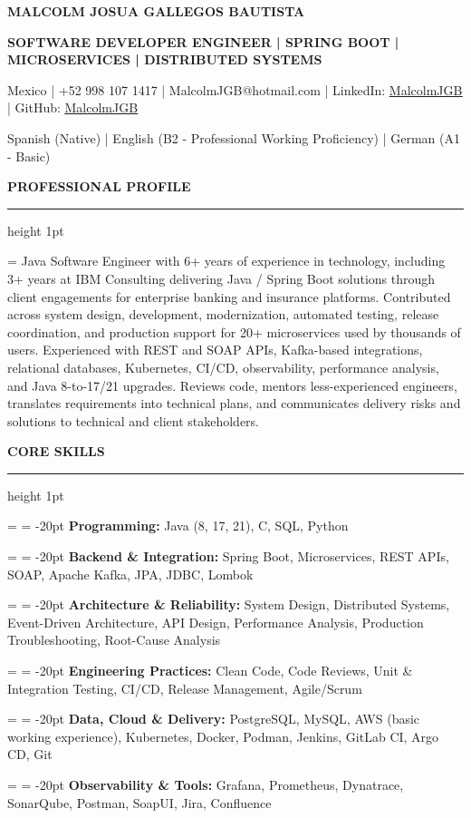 \documentclass[letterpaper]{article}
\newlength{\singlelinespacing}
\newlength{\profileindent}
\newlength{\skillindent}
\newcommand{\sectiontitle}[1]{
  \vspace{10pt}
  {\fontsize{10}{\singlelinespacing} \selectfont 
    \bfseries{#1} \par}
  \vspace{1pt}
  \hrule height 1pt
  \vspace{10pt}
}
\newcommand{\skillitem}[2]{
  {\fontsize{9}{\singlelinespacing} \selectfont
    \leftskip = \skillindent
    \sloppy
    \parindent = -20pt
    \makebox[15pt][l]{\textbullet} 
    \textbf{#1}{#2} \par}
  \vspace{1pt}
}
\begin{document}
{\centering \fontsize{18}{\singlelinespacing} \selectfont \bfseries{MALCOLM JOSUA GALLEGOS BAUTISTA} \par}
\vspace{5pt}
{\centering \fontsize{10}{\singlelinespacing} \selectfont \bfseries{SOFTWARE DEVELOPER ENGINEER | SPRING BOOT | MICROSERVICES | DISTRIBUTED SYSTEMS} \par}
\vspace{5pt}
{\centering \fontsize{9}{\singlelinespacing} \selectfont
  Mexico | +52 998 107 1417 | MalcolmJGB@hotmail.com | 
  LinkedIn: \href{https://www.linkedin.com/in/malcolmjgb}{\underline{MalcolmJGB}} | 
  GitHub: \href{https://github.com/MalcolmJGB}{\underline{MalcolmJGB}} 
  \par}
\vspace{5pt}
{\centering \fontsize{9}{\singlelinespacing} \selectfont Spanish (Native) | English (B2 - Professional Working Proficiency) | German (A1 - Basic) \par}

\sectiontitle{PROFESSIONAL PROFILE}
{\fontsize{9}{\singlelinespacing} \selectfont
  \leftskip = \profileindent
  \sloppy
  Java Software Engineer with 6+ years of experience in technology, including 3+ years at IBM Consulting delivering Java / Spring Boot solutions through client engagements for enterprise banking and insurance platforms. Contributed across system design, development, modernization, automated testing, release coordination, and production support for 20+ microservices used by thousands of users. Experienced with REST and SOAP APIs, Kafka-based integrations, relational databases, Kubernetes, CI/CD, observability, performance analysis, and Java 8-to-17/21 upgrades. Reviews code, mentors less-experienced engineers, translates requirements into technical plans, and communicates delivery risks and solutions to technical and client stakeholders.
  \par}

\sectiontitle{CORE SKILLS}
\skillitem{Programming: }{Java (8, 17, 21), C, SQL, Python}
\skillitem{Backend \& Integration: }{Spring Boot, Microservices, REST APIs, SOAP, Apache Kafka, JPA, JDBC, Lombok}
\skillitem{Architecture \& Reliability: }{System Design, Distributed Systems, Event-Driven Architecture, API Design, Performance Analysis, Production Troubleshooting, Root-Cause Analysis}
\skillitem{Engineering Practices: }{Clean Code, Code Reviews, Unit \& Integration Testing, CI/CD, Release Management, Agile/Scrum}
\skillitem{Data, Cloud \& Delivery: }{PostgreSQL, MySQL, AWS (basic working experience), Kubernetes, Docker, Podman, Jenkins, GitLab CI, Argo CD, Git}
\skillitem{Observability \& Tools: }{Grafana, Prometheus, Dynatrace, SonarQube, Postman, SoapUI, Jira, Confluence}
\end{document}
